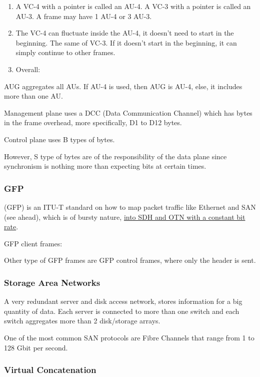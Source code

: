 \begin{enumerate}
    \item A VC-4 with a pointer is called an AU-4. A VC-3 with a pointer is called an AU-3. A frame may have 1 AU-4 or 3 AU-3.
    \item The VC-4 can fluctuate inside the AU-4, it doesn't need to start in the beginning. The same of VC-3. If it doesn't start in the beginning, it can simply continue to other frames.
    \item Overall:
\end{enumerate}


AUG aggregates all AUs. If AU-4 is used, then AUG is AU-4, else, it includes more than one AU.


Management plane uses a DCC (Data Communication Channel) which has bytes in the frame overhead, more specifically, D1 to D12 bytes.

Control plane uses B types of bytes.

However, S type of bytes are of the responsibility of the data plane since synchronism is nothing more than expecting bits at certain times.

\subsubsection*{GFP }
(GFP) is an ITU-T standard on how to map packet traffic like Ethernet and SAN (see ahead), which is of bursty nature, \ul{into SDH and OTN with a constant bit rate}.


GFP client frames:

Other type of GFP frames are GFP control frames, where only the header is sent.




\subsubsection*{Storage Area Networks}
A very redundant server and disk access network, stores information for a big quantity of data. Each server is connected to more than one switch and each switch aggregates more than 2 disk/storage arrays.


One of the most common SAN protocols are Fibre Channels that range from 1 to 128 Gbit per second.





\subsubsection*{Virtual Concatenation}

